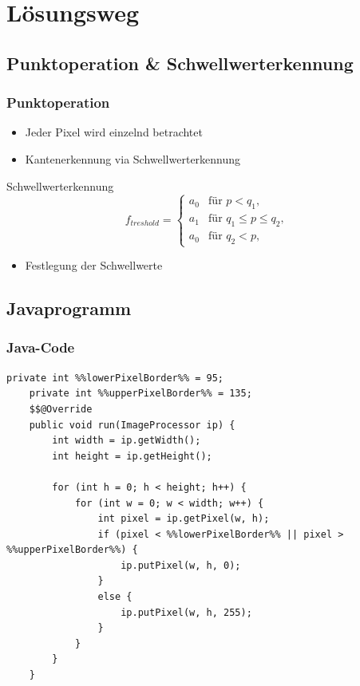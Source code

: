 \documentclass[14pt]{beamer}
\begin{document}
\section{Lösungsweg}
\subsection{Punktoperation \& Schwellwerterkennung}
\begin{frame}
\frametitle{Punktoperation}
\begin{itemize}
	\item Jeder Pixel wird einzelnd betrachtet
	\item Kantenerkennung via Schwellwerterkennung
\end{itemize}

\pause

\begin{block}{Schwellwerterkennung}	
	\begin{equation*}
		f_{treshold}=
		\begin{cases}
			a_0   			& \text{für } p < q_1,\\
			a_1        		& \text{für } q_1 \leq p \leq q_2, \\
			a_0        		& \text{für } q_2 < p,
		\end{cases}
	\end{equation*}
\end{block}

\begin{itemize}
	\item Festlegung der Schwellwerte
\end{itemize}

\end{frame}
\subsection{Javaprogramm}
\begin{frame}[fragile]
	\frametitle{Java-Code}
	\begin{lstlisting}[basicstyle=\scriptsize]
	private int %%lowerPixelBorder%% = 95;
	private int %%upperPixelBorder%% = 135;	
	$$@Override
	public void run(ImageProcessor ip) {
		int width = ip.getWidth();
		int height = ip.getHeight();
		
		for (int h = 0; h < height; h++) {
			for (int w = 0; w < width; w++) {
				int pixel = ip.getPixel(w, h);
				if (pixel < %%lowerPixelBorder%% || pixel > %%upperPixelBorder%%) {
					ip.putPixel(w, h, 0);
				}
				else {
					ip.putPixel(w, h, 255);
				}
			}
		}	
	}
	\end{lstlisting}
\end{frame}
\end{document}

